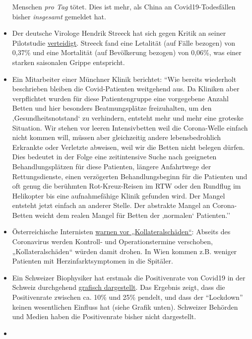 \begin{itemize}
  Menschen \emph{pro Tag} tötet. Dies ist mehr, als China an
  Covid19-Todesfällen bisher \emph{insgesamt} gemeldet hat.
\item
  Der deutsche Virologe Hendrik Streeck hat sich gegen Kritik an seiner
  Pilotstudie
  \href{https://www.tagesspiegel.de/wissen/virologe-streeck-zur-coronavirus-studie-die-veroeffentlichung-zu-heinsberg-war-nicht-leichtfertig/25735672.html}{verteidigt}.
  Streeck fand eine Letalität (auf Fälle bezogen) von 0,37\% und eine
  Mortalität (auf Bevölkerung bezogen) von 0,06\%, was einer starken
  saisonalen Grippe entspricht.
\item
  Ein Mitarbeiter einer Münchner Klinik berichtet: ``Wie bereits
  wiederholt beschrieben bleiben die Covid-Patienten weitgehend aus. Da
  Kliniken aber verpflichtet wurden für diese Patientengruppe eine
  vorgegebene Anzahl Betten und hier besonders Beatmungsplätze
  freizuhalten, um den ,Gesundheitsnotstand` zu verhindern, entsteht
  mehr und mehr eine groteske Situation. Wir stehen vor leeren
  Intensivbetten weil die Corona-Welle einfach nicht kommen will, müssen
  aber gleichzeitig andere lebens­bedrohlich Erkrankte oder Verletzte
  abweisen, weil wir die Betten nicht belegen dürfen. Dies bedeutet in
  der Folge eine zeitintensive Suche nach geeigneten Behandlungsplätzen
  für diese Patienten, längere Anfahrtwege der Rettungsdienste, einen
  verzögerten Behandlungsbeginn für die Patienten und oft genug die
  berühmten Rot-Kreuz-Reisen im RTW oder den Rundflug im Helikopter bis
  eine aufnahmefähige Klinik gefunden wird. Der Mangel entsteht jetzt
  einfach an anderer Stelle. Der abstrakte Mangel an Corona-Betten
  weicht dem realen Mangel für Betten der ,normalen` Patienten.''
\item
  Österreichische Internisten
  \href{https://wien.orf.at/stories/3044064}{warnen vor
  „Kollateralschäden``}: Abseits des Coronavirus werden Kontroll- und
  Operationstermine verschoben, „Kollateralschäden`` würden damit
  drohen. In Wien kommen z.B. weniger Patienten mit Herzinfarktsymptomen
  in die Spitäler.
\item
  Ein Schweizer Biophysiker hat erstmals die Positivenrate von Covid19
  in der Schweiz durchgehend
  \href{https://swprs.org/rate-of-positive-covid19-tests/}{grafisch
  dargestellt}. Das Ergebnis zeigt, dass die Positivenrate zwischen ca.
  10\% und 25\% pendelt, und dass der ``Lockdown'' keinen wesentlichen
  Einfluss hat (siehe Grafik unten). Schweizer Behörden und Medien haben
  die Positivenrate bisher nicht dargestellt.
\item

\end{itemize}
